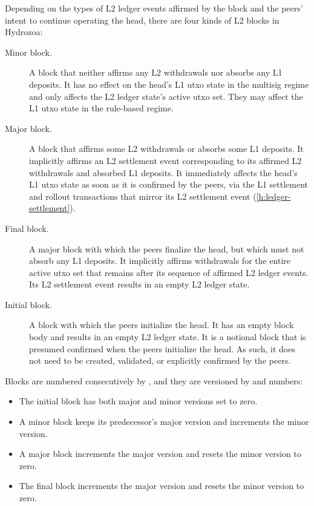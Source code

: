 \documentclass[../hydrozoa.tex]{subfiles}
\begin{document}
Depending on the types of L2 ledger events affirmed by the block and the peers' intent to continue operating the head, there are four kinds of L2 blocks in Hydrozoa:
\begin{description}
  \item[Minor block.] A block that neither affirms any L2 withdrawals nor absorbs any L1 deposits.
    It has no effect on the head's L1 utxo state in the multisig regime and only affects the L2 ledger state's active utxo set.
    They may affect the L1 utxo state in the rule-based regime.
  \item[Major block.] A block that affirms some L2 withdrawals or absorbs some L1 deposits.
    It implicitly affirms an L2 settlement event corresponding to its affirmed L2 withdrawals and absorbed L1 deposits.
    It immediately affects the head's L1 utxo state as soon as it is confirmed by the peers, via the L1 settlement and rollout transactions that mirror its L2 settlement event (\cref{h:ledger-settlement}).
  \item[Final block.] A major block with which the peers finalize the head, but which must not absorb any L1 deposits.
    It implicitly affirms withdrawals for the entire active utxo set that remains after its sequence of affirmed L2 ledger events.
    Its L2 settlement event results in an empty L2 ledger state.
  \item[Initial block.] A block with which the peers initialize the head.
    It has an empty block body and results in an empty L2 ledger state.
    It is a notional block that is presumed confirmed when the peers initialize the head.
    As such, it does not need to be created, validated, or explicitly confirmed by the peers.
\end{description}

Blocks are numbered consecutively by , and they are versioned by  and  numbers:
\begin{itemize}
  \item The initial block has both major and minor versions set to zero.
  \item A minor block keeps its predecessor's major version and increments the minor version.
  \item A major block increments the major version and resets the minor version to zero.
  \item The final block increments the major version and resets the minor version to zero.
\end{itemize}
\end{document}
